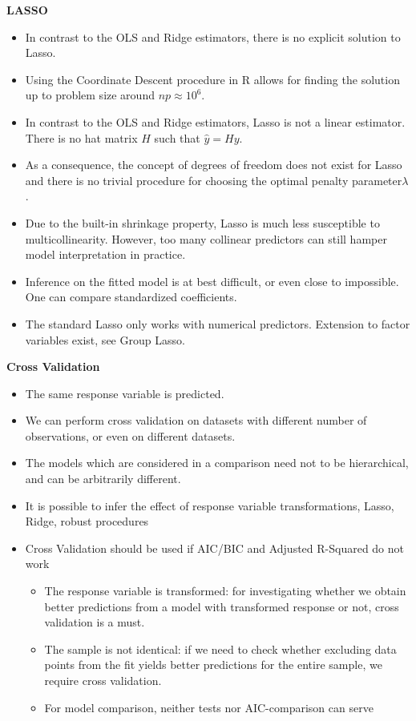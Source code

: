 \documentclass[a4paper]{article}
\begin{document}
\textbf{LASSO}
\begin{itemize}
    \item In contrast to the OLS and Ridge estimators, there is no explicit solution to Lasso.
    \item Using the Coordinate Descent procedure in R allows for finding the solution up to problem size around $np\approx10^6$.
    \item In contrast to the OLS and Ridge estimators, Lasso is not a linear estimator. There is no hat matrix $H$ such that $\hat{y}=Hy$.
    \item As a consequence, the concept of degrees of freedom does not exist for Lasso and there is no trivial procedure for choosing the optimal penalty parameter$\lambda$.
    \item Due to the built-in shrinkage property, Lasso is much less susceptible to multicollinearity. However, too many collinear predictors can still hamper model interpretation in practice.
    \item Inference on the fitted model is at best difficult, or even close to impossible. One can compare standardized coefficients.
    \item The standard Lasso only works with numerical predictors. Extension to factor variables exist, see Group Lasso.
\end{itemize}

\textbf{Cross Validation}
\begin{itemize}
    \item The same response variable is predicted.
    \item We can perform cross validation on datasets with different number of observations, or even on different datasets.
    \item The models which are considered in a comparison need not to be hierarchical, and can be arbitrarily different.
    \item It is possible to infer the effect of response variable transformations, Lasso, Ridge, robust procedures
    \item Cross Validation should be used if AIC/BIC and Adjusted R-Squared do not work
    \begin{itemize}
        \item The response variable is transformed: for investigating whether we obtain better predictions from a model with transformed response or not, cross validation is a must.
        \item The sample is not identical: if we need to check whether excluding data points from the fit yields better predictions for the entire sample, we require cross validation.
        \item For model comparison, neither tests nor AIC-comparison can serve
    \end{itemize}
\end{itemize}
\end{document}

